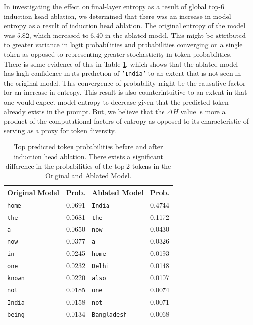 \documentclass[twocolumn]{article}
\begin{document}
In investigating the effect on final-layer entropy as a result of global top-6 induction head ablation, we determined that there was an increase in model entropy as a result of induction head ablation. The original entropy of the model was 5.82, which increased to 6.40 in the ablated model. This might be attributed to greater variance in logit probabilities and probabilities converging on a single token as opposed to representing greater stochasticity in token probabilities. There is some evidence of this in Table \ref{tab:top_token}, which shows that the ablated model has high confidence in its prediction of \texttt{'India'} to an extent that is not seen in the original model. This convergence of probability might be the causative factor for an increase in entropy. This result is also counterintuitive to an extent in that one would expect model entropy to decrease given that the predicted token already exists in the prompt. But, we believe that the $\Delta H$ value is more a product of the computational factors of entropy as opposed to its characteristic of serving as a proxy for token diversity. \\

\begin{table}[t]
\centering
\footnotesize
\setlength{\tabcolsep}{3pt}
\begin{tabular}{@{}l c l c@{}}
\toprule
\textbf{Original Model} & \textbf{Prob.} & 
\textbf{Ablated Model} & \textbf{Prob.} \\
\midrule
\texttt{home}       & 0.0691 & \texttt{India}      & 0.4744 \\
\texttt{the}        & 0.0681 & \texttt{the}        & 0.1172 \\
\texttt{a}          & 0.0650 & \texttt{now}        & 0.0430 \\
\texttt{now}        & 0.0377 & \texttt{a}          & 0.0326 \\
\texttt{in}         & 0.0245 & \texttt{home}       & 0.0193 \\
\texttt{one}        & 0.0232 & \texttt{Delhi}      & 0.0148 \\
\texttt{known}      & 0.0220 & \texttt{also}       & 0.0107 \\
\texttt{not}        & 0.0185 & \texttt{one}        & 0.0074 \\
\texttt{India}      & 0.0158 & \texttt{not}        & 0.0071 \\
\texttt{being}      & 0.0134 & \texttt{Bangladesh} & 0.0068 \\
\bottomrule
\end{tabular}
\caption{Top predicted token probabilities before and after induction head ablation. There exists a significant difference in the probabilities of the top-2 tokens in the Original and Ablated Model.}
\label{tab:top_token}
\end{table}
\end{document}
